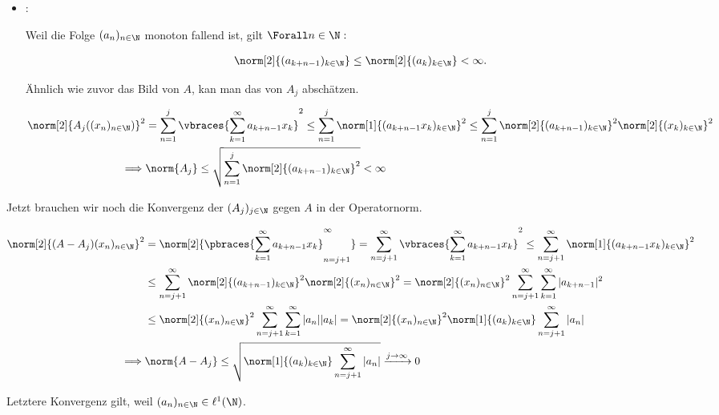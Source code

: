 \begin{solution}
\begin{itemize}
  \item
  :

  Weil die Folge $(a_n)_{n \in \N}$ monoton fallend ist, gilt $\Forall n \in \N:$

  \begin{align*}
    \norm[2]{(a_{k+n-1})_{k \in \N}}
    \leq
    \norm[2]{(a_k)_{k \in \N}} < \infty.
  \end{align*}

  Ähnlich wie zuvor das Bild von $A$, kan man das von $A_j$ abschätzen.

  \begin{align*}
    \norm[2]{A_j((x_n)_{n \in \N})}^2
    & =
    \sum_{n=1}^j
    \vbraces
    {
      \sum_{k=1}^\infty
      a_{k+n-1} x_k
    }^2
    \leq
    \sum_{n=1}^j
    \norm[1]{(a_{k+n-1} x_k)_{k \in \N}}^2
    \leq
    \sum_{n=1}^j
    \norm[2]{(a_{k+n-1})_{k \in \N}}^2
    \norm[2]{(x_k)_{k \in \N}}^2 \\
    \implies &
    \norm{A_j}
    \leq
    \sqrt
    {
      \sum_{n=1}^j
      \norm[2]{(a_{k+n-1})_{k \in \N}}^2
    } < \infty
  \end{align*}

\end{itemize}

Jetzt brauchen wir noch die Konvergenz der $(A_j)_{j \in \N}$ gegen $A$ in der Operatornorm.

\begin{align*}
  \norm[2]{(A - A_j)(x_n)_{n \in \N}}^2
  & =
  \norm[2]
  {
    \pbraces
    {
      \sum_{k=1}^\infty
      a_{k+n-1} x_k
    }_{n = j+1}^\infty
  }
  =
  \sum_{n = j+1}^\infty
  \vbraces
  {
    \sum_{k=1}^\infty
    a_{k+n-1} x_k
  }^2
  \leq
  \sum_{n = j+1}^\infty
  \norm[1]{(a_{k+n-1} x_k)_{k \in \N}}^2 \\
  & \leq
  \sum_{n = j+1}^\infty
  \norm[2]{(a_{k+n-1})_{k \in \N}}^2
  \norm[2]{(x_n)_{n \in \N}}^2
  =
  \norm[2]{(x_n)_{n \in \N}}^2
  \sum_{n = j+1}^\infty
  \sum_{k=1}^\infty
  |a_{k+n-1}|^2 \\
  & \leq
  \norm[2]{(x_n)_{n \in \N}}^2
  \sum_{n = j+1}^\infty
  \sum_{k=1}^\infty
  |a_n| |a_k|
  =
  \norm[2]{(x_n)_{n \in \N}}^2
  \norm[1]{(a_k)_{k \in \N}}
  \sum_{n = j+1}^\infty |a_n| \\
  \implies &
  \norm{A - A_j}
  \leq
  \sqrt
  {
    \norm[1]{(a_k)_{k \in \N}}
    \sum_{n = j+1}^\infty |a_n|
  }
  \xrightarrow{j \to \infty} 0
\end{align*}

Letztere Konvergenz gilt, weil $(a_n)_{n \in \N} \in \ell^1(\N)$. \\


\end{solution}
